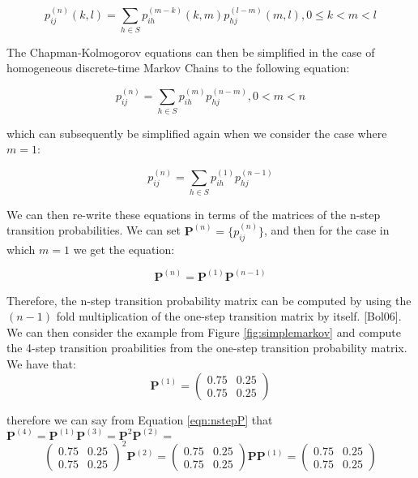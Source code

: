 \documentclass[a4paper,11pt,titlepage]{article}
\begin{document}
\begin{equation}
    p_{ij}^{(n)}(k,l) = \sum_{h \in S} p_{ih}^{(m-k)}(k,m)p_{hj}^{(l-m)}(m,l), 0 \leq k < m < l
\end{equation}

The Chapman-Kolmogorov equations can then be simplified in the case of homogeneous discrete-time Markov Chains to the following equation: 

\begin{equation}
    p_{ij}^{(n)} = \sum_{h \in S} p_{ih}^{(m)}p_{hj}^{(n-m)}, 0 < m < n
\end{equation}

which can subsequently be simplified again when we consider the case where $m=1$:

\begin{equation}
    p_{ij}^{(n)} = \sum_{h \in S} p_{ih}^{(1)}p_{hj}^{(n-1)}
\end{equation}

We can then re-write these equations in terms of the matrices of the n-step transition probabilities. We can set $\mathbf{P}^{(n)} = \{p_{ij}^{(n)}\}$, and then for the case in which $m=1$ we get the equation: 

\begin{equation}
    \mathbf{P}^{(n)} = \mathbf{P}^{(1)}\mathbf{P}^{(n-1)}
    \label{eqn:nstepP}
\end{equation}

Therefore, the n-step transition probability matrix can be computed by using the $(n-1)$ fold multiplication of the one-step transition matrix by itself. [Bol06]. We can then consider the example from Figure \ref{fig:simplemarkov} and compute the 4-step transition proabilities from the one-step transition probability matrix. We have that: \[ \mathbf{P}^{(1)} = \left( \begin{array}{cc}
0.75 & 0.25 \\
0.75 & 0.25 \end{array} \right)\]

therefore we can say from Equation \ref{eqn:nstepP} that $\mathbf{P}^{(4)} = \mathbf{P}^{(1)} \mathbf{P}^{(3)} = \mathbf{P}^2 \mathbf{P}^{(2)} = $ \[\left( \begin{array}{cc}
0.75 & 0.25 \\
0.75 & 0.25 \end{array} \right)^2 \mathbf{P}^{(2)} = \left( \begin{array}{cc}
0.75 & 0.25 \\
0.75 & 0.25 \end{array} \right) \mathbf{P} \mathbf{P}^{(1)} = \left( \begin{array}{cc}
0.75 & 0.25 \\
0.75 & 0.25 \end{array} \right)\]
\end{document}
